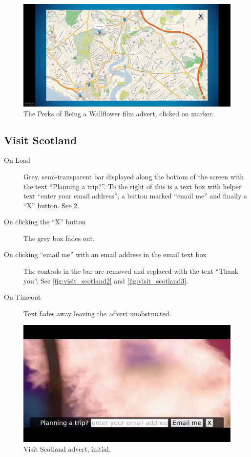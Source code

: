 	\begin{figure}[th]
		\centering
		\includegraphics[width=\textwidth,height=0.5\textheight,keepaspectratio]{images/adverts/wallflower-4.png}
		\caption{The Perks of Being a Wallflower film advert, clicked on marker.}
		\label{fig:wallflower4}
	\end{figure}
	
\subsection{Visit Scotland}
	\begin{description}
		\item[On Load]{Grey, semi-transparent bar displayed along the bottom of the screen with the text ``Planning a trip?''. To the right of this is a text box with helper text ``enter your email address'', a button marked ``email me'' and finally a ``X'' button. See \ref{fig:visit_scotland1}.}
		\item[On clicking the ``X'' button]{The grey box fades out.}
		\item[On clicking ``email me'' with an email address in the email text box]{The controls in the bar are removed and replaced with the text ``Thank you''. See \ref{fig:visit_scotland2} and \ref{fig:visit_scotland3}.}
		\item[On Timeout]{Text fades away leaving the advert unobstructed.}
	\end{description}
	
	\begin{figure}[th]
		\centering
		\includegraphics[width=\textwidth,height=0.5\textheight,keepaspectratio]{images/adverts/visit_scotland-1.png}
		\caption{Visit Scotland advert, initial.}
		\label{fig:visit_scotland1}
	\end{figure}
	
